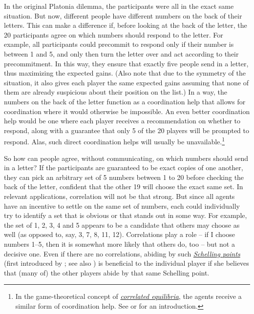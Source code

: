 In the original Platonia dilemma, the participants were all in the exact
same situation. But now, different people have different numbers on the
back of their letters. This can make a difference if, before looking at
the back of the letter, the 20 participants agree on which numbers
should respond to the letter. For example, all participants could
precommit to respond only if their number is between 1 and 5, and only
then turn the letter over and act according to their precommitment. In
this way, they ensure that exactly five people send in a letter, thus
maximizing the expected gains. (Also note that due to the symmetry of
the situation, it also gives each player the same expected gains
assuming that none of them are already suspicious about their position
on the list.) In a way, the numbers on the back of the letter function
as a coordination help that allows for coordination where it would
otherwise be impossible. An even better coordination help would be one
where each player receives a recommendation on whether to respond, along
with a guarantee that only 5 of the 20 players will be prompted to
respond. Alas, such direct coordination helps will usually be
unavailable.\footnote{In the game-theoretical concept of
  \href{https://en.wikipedia.org/wiki/Correlated_equilibrium}{\emph{correlated
  equilibria}}, the agents receive a similar form of coordination help.
  See \parencite{Leyton-Brown2008-un} or
  \parencite{Osborne1994-ln} for an introduction.}

So how can people agree, without communicating, on which numbers should
send in a letter? If the participants are guaranteed to be exact copies
of one another, they can pick an arbitrary set of 5 numbers between 1 to
20 before checking the back of the letter, confident that the other 19
will choose the exact same set. In relevant applications, correlation
will not be that strong. But since all agents have an incentive to
settle on the same set of numbers, each could individually try to
identify a set that is obvious or that stands out in some way. For
example, the set of 1, 2, 3, 4 and 5 appears to be a candidate that
others may choose as well (as opposed to, say, 3, 7, 8, 11, 12).
Correlations play a role -- if I choose numbers 1--5, then it is
somewhat more likely that others do, too -- but not a decisive one. Even
if there are no correlations, abiding by such
\href{https://en.wikipedia.org/wiki/Focal_point_(game_theory)}{\emph{Schelling
points}} (first introduced by \parencite{Schelling1960-dn};
see also \parencite{Friedman1994-ie}) is beneficial to the
individual player if she believes that (many of) the other players abide
by that same Schelling point.

